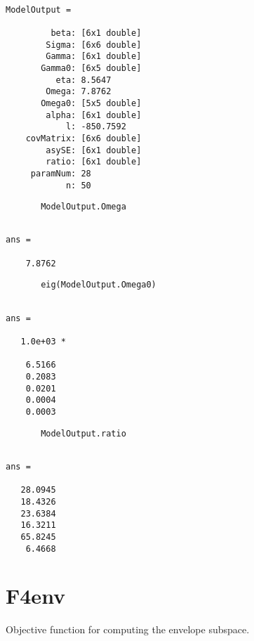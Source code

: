 \documentclass[a4paper,11pt,openany]{memoir}
\begin{document}
        \color{lightgray}\ttfamily \begin{verbatim}

ModelOutput = 

         beta: [6x1 double]
        Sigma: [6x6 double]
        Gamma: [6x1 double]
       Gamma0: [6x5 double]
          eta: 8.5647
        Omega: 7.8762
       Omega0: [5x5 double]
        alpha: [6x1 double]
            l: -850.7592
    covMatrix: [6x6 double]
        asySE: [6x1 double]
        ratio: [6x1 double]
     paramNum: 28
            n: 50
\end{verbatim} \rmfamily
\color{black}
\begin{verbatim}
       ModelOutput.Omega
       \end{verbatim}

        \color{lightgray}\ttfamily \begin{verbatim}

ans =

    7.8762
\end{verbatim} \rmfamily
\color{black}
\begin{verbatim}
       eig(ModelOutput.Omega0)
       \end{verbatim}
        \color{lightgray}\ttfamily \begin{verbatim}

ans =

   1.0e+03 *

    6.5166
    0.2083
    0.0201
    0.0004
    0.0003

\end{verbatim} \rmfamily
\color{black}
\begin{verbatim}
       ModelOutput.ratio
       \end{verbatim}
        \color{lightgray}\ttfamily \begin{verbatim}

ans =

   28.0945
   18.4326
   23.6384
   16.3211
   65.8245
    6.4668

\end{verbatim} \rmfamily
\color{black}

\newpage


\rmfamily
\color{black}\section{F4env}

\begin{par}
Objective function for computing the envelope subspace.
\end{par} \vspace{1em}
\end{document}

